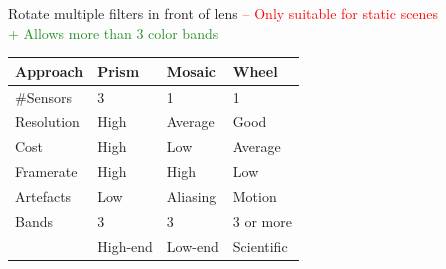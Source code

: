 \documentclass[a4paper, fontsize=8pt, landscape, DIV=1]{scrartcl}
\begin{document}
\begin{multicols*}{4}
\begin{center}
		\end{center}
		Rotate multiple filters in front of lens
		\textcolor{red}{ -- Only suitable for static scenes}\\
		\textcolor{ForestGreen}{+ Allows more than 3 color bands}
		
		\begin{tabular}{l l l l}
			\hline 
			\hline 
			Approach  &Prism  &Mosaic  &Wheel  \\
			\hline  
			\#Sensors &3  	 &1  	  &1  \\ 
			Resolution&High  &Average &Good  \\ 
			Cost	  &High  &Low	  &Average  \\ 
			Framerate &High  &High	  &Low  \\ 
			Artefacts &Low	 &Aliasing&Motion  \\ 
			Bands	  &3  	 &3  	  &3 or more  \\
					  &High-end &Low-end  &Scientific  \\  
			\hline 
			\hline 
		\end{tabular} 
	

\end{multicols*}
\end{document}
